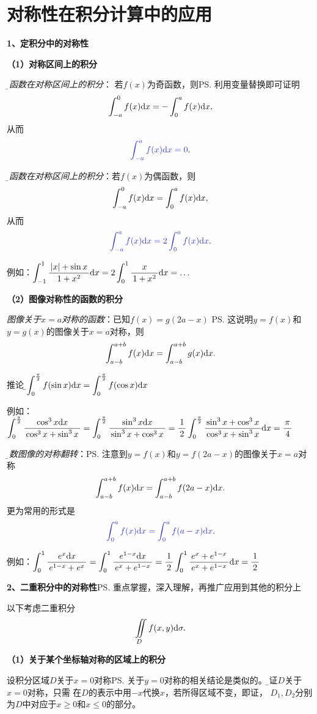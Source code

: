 \newpage

\section{对称性在积分计算中的应用}

\bigskip

{\bf 1、定积分中的对称性}

{\bf （1）对称区间上的积分}

{\it\b 奇函数在对称区间上的积分}：
若$f(x)$为奇函数，则\ps{利用变量替换即可证明}
$$\int_{-a}^0f(x)\mathrm{d} x=-\int_0^af(x)\mathrm{d} x,$$
从而
$${\b \int_{-a}^af(x)\d x=0}.$$

{\it\b 偶函数在对称区间上的积分}：若$f(x)$为偶函数，则
$$\int_{-a}^0f(x)\mathrm{d} x=\int_0^af(x)\mathrm{d} x,$$
从而
$${\b \int_{-a}^af(x)\d x=2\int_0^af(x)\d x}.$$

例如：$\displaystyle\int_{-1}^{1}\displaystyle\frac{\,{|x|+\sin x}\,}{\,{1+x^2}\,}\mathrm{d} x
=2\displaystyle\int_0^{1}\displaystyle\frac{\,{x}\,}{\,{1+x^2}\,}\mathrm{d} x=\ldots$

{\bf （2）图像对称性的函数的积分}

{\it 图像关于$x=a$对称的函数}：已知$f(x)=g(2a-x)$
\ps{这说明$y=f(x)$和$y=g(x)$的图像关于$x=a$对称}，则
$$\int_{a-b}^{a+b}f(x)\mathrm{d} x=\int_{a-b}^{a+b}g(x)\mathrm{d} x.$$

推论：{\b $\displaystyle\int_0^{\frac{\pi}2}f(\sin x)\mathrm{d} x=\displaystyle\int_0^{\frac{\pi}2}f(\cos x)\mathrm{d} x$}

例如：$\displaystyle\int_0^{\frac{\pi}2}\displaystyle\frac{\,{\cos^3x\mathrm{d} x}\,}{\,{\cos^3x+\sin^3x}\,}
=\displaystyle\int_0^{\frac{\pi}2}\displaystyle\frac{\,{\sin^3x\mathrm{d} x}\,}{\,{\sin^3x+\cos^3x}\,}
=\displaystyle\frac{\,{1}\,}{\,{2}\,}\displaystyle\int_0^{\frac{\pi}2}\displaystyle\frac{\,{\sin^3x+\cos^3x}\,}{\,{\cos^3x+\sin^3x}\,}\mathrm{d} x=\displaystyle\frac{\,{\pi}\,}{\,{4}\,}$

{\it\b 函数图像的对称翻转}：\ps{注意到$y=f(x)$和$y=f(2a-x)$的图像关于$x=a$对称}
$$\int_{a-b}^{a+b}f(x)\mathrm{d} x=\int_{a-b}^{a+b}f(2a-x)\mathrm{d} x.$$
更为常用的形式是
$${\b \int_0^af(x)\d x=\int_0^af(a-x)\d x}.$$

例如：$\displaystyle\int_0^1\displaystyle\frac{\,{e^x\mathrm{d} x}\,}{\,{e^{1-x}+e^x}\,}
=\displaystyle\int_0^1\displaystyle\frac{\,{e^{1-x}\mathrm{d} x}\,}{\,{e^x+e^{1-x}}\,}
=\displaystyle\frac{\,{1}\,}{\,{2}\,}\displaystyle\int_0^1\displaystyle\frac{\,{e^x+e^{1-x}}\,}{\,{e^x+e^{1-x}}\,}\mathrm{d} x=\displaystyle\frac{\,{1}\,}{\,{2}\,}$

\bigskip

{\bf 2、二重积分中的对称性}\ps{重点掌握，深入理解，再推广应用到其他的积分上}

以下考虑二重积分
$$\displaystyle\iint\limits_Df(x,y)\mathrm{d}\sigma.$$

{\bf（1）关于某个坐标轴对称的区域上的积分}

设积分区域$D$关于$x=0$对称\ps{关于$y=0$对称的相关结论是类似的。\b 验证$D$关于$x=0$对称，只需
在$D$的表示中用$-x$代换$x$，若所得区域不变，即证}，
$D_1,D_2$分别为$D$中对应于$x\geq0$和$x\leq0$的部分。

